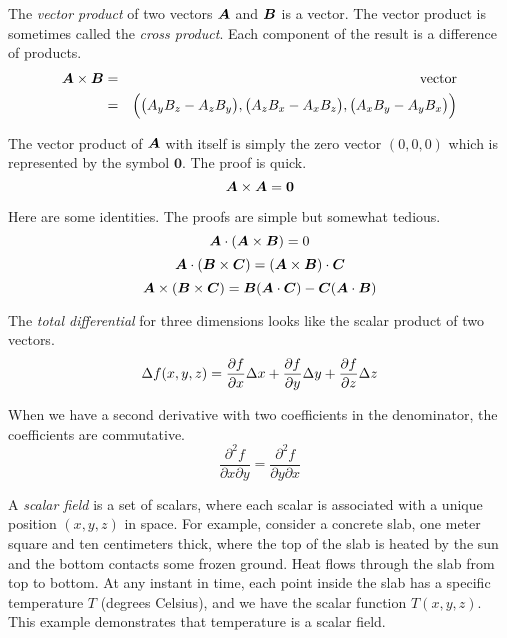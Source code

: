 The \emph{vector product} of two vectors $\boldsymbol{A}$ and $\boldsymbol{B}$ is a vector.
The vector product is sometimes called the \emph{cross product}.
Each component of the result is a difference of products.
\begin{eqnarray}
  \boldsymbol{A} \times \boldsymbol{B} &=& \mathrm{vector} \\
  &=& \Big( \big( A_y B_z - A_z B_y \big),
            \big( A_z B_x - A_x B_z \big), 
	    \big( A_x B_y - A_y B_x \big) \Big) \nonumber
\end{eqnarray}

The vector product of $\boldsymbol{A}$ with itself is simply 
the zero vector $(0,0,0)$ which is represented by the symbol $\boldsymbol{0}$.
The proof is quick.
\begin{equation}
  \boldsymbol{A} \times \boldsymbol{A} = \boldsymbol{0}
\end{equation}

Here are some identities.
The proofs are simple but somewhat tedious.
\begin{equation}
  \boldsymbol{A} \cdot (\boldsymbol{A} \times \boldsymbol{B}) = 0
\end{equation}
\begin{equation}
  \boldsymbol{A} \cdot (\boldsymbol{B} \times \boldsymbol{C}) = (\boldsymbol{A} \times \boldsymbol{B}) \cdot \boldsymbol{C}
\end{equation}
\begin{equation}
  \boldsymbol{A} \times (\boldsymbol{B} \times \boldsymbol{C}) = \boldsymbol{B}(\boldsymbol{A} \cdot \boldsymbol{C}) - \boldsymbol{C}(\boldsymbol{A} \cdot \boldsymbol{B})
\end{equation}


The \emph{total differential} for three dimensions looks like 
the scalar product of two vectors.
\begin{equation}
  \Delta f(x,y,z) = \frac{\partial f}{\partial x} \Delta x + \frac{\partial f}{\partial y} \Delta y + \frac{\partial f}{\partial z} \Delta z
\end{equation}


When we have a second derivative with two coefficients in the denominator,
the coefficients are commutative.
\begin{equation}
  \frac{\partial ^2 f}{\partial x \partial y} = \frac{\partial ^2 f}{\partial y \partial x}
\end{equation}

A \emph{scalar field} is a set of scalars, where each scalar is associated
with a unique position $(x,y,z)$ in space.
For example, consider a concrete slab, one meter square and ten centimeters thick,
where the top of the slab is heated by the sun and the bottom contacts some frozen ground.
Heat flows through the slab from top to bottom.
At any instant in time, each point inside the slab has a specific temperature $T$
(degrees Celsius), and we have the scalar function $T(x,y,z)$.
This example demonstrates that temperature is a scalar field.

